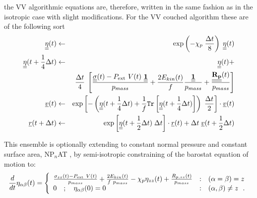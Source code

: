 the VV algorithmic equations are, therefore,
written in the same fashion as in the isotropic case with
slight modifications.  For the VV couched algorithm
these are of the following sort
\begin{eqnarray}
\mbox{$\underline{\underline{\bf \eta}}$} (t) &\leftarrow& \exp \left( -\chi_{p} \; {\Delta t \over 8} \right) \;
\mbox{$\underline{\underline{\bf \eta}}$} (t)\nonumber \\
\mbox{$\underline{\underline{\bf \eta}}$}(t + {1 \over 4} \Delta t) &\leftarrow& \mbox{$\underline{\underline{\bf \eta}}$}(t) + \nonumber \\
&& {\Delta t \over 4} \; \left[ \frac{\mbox{$\underline{\underline{\bf \sigma}}$}(t) - P_{\rm ext}~V(t)~\mbox{$\underline{\underline{\bf 1}}$}}{p_{mass}} +
\frac{2 E_{kin}(t)}{f} \frac{\mbox{$\underline{\underline{\bf 1}}$}}{p_{mass}} + \frac{\mbox{$\underline{\underline{\bf R_{p}}}$}(t)}{p_{mass}} \right] \\
\mbox{$\underline{v}$}(t) &\leftarrow& \exp \left[ -\left( \mbox{$\underline{\underline{\bf \eta}}$}(t + {1 \over 4}\Delta t) +
\frac{1}{f} {\tt Tr}\left[\mbox{$\underline{\underline{\bf \eta}}$}(t + {1 \over 4}\Delta t)\right] \right) \;
{\Delta t \over 2} \right] \cdot \mbox{$\underline{v}$}(t) \nonumber \\
\mbox{$\underline{r}$}(t + \Delta t) &\leftarrow& \exp \left[ \mbox{$\underline{\underline{\bf \eta}}$} (t + {1 \over 2} \Delta t) \; \Delta t \right] \cdot
\mbox{$\underline{r}$}(t) + \Delta t \; \mbox{$\underline{v}$}(t + {1 \over 2} \Delta t) \nonumber
\end{eqnarray}


This ensemble is optionally extending to constant normal pressure
and constant surface area, NP$_{n}$AT \cite{ikeguchi-04a}, by semi-isotropic
constraining of the barostat equation of motion to:
\begin{equation}
\frac{d}{dt} \eta_{\alpha\beta}(t) = \left\{ \begin{array} {l@{\quad:\quad}l}
\frac{\sigma_{zz}(t) - P_{\rm ext}~V(t)}{p_{mass}} + \frac{2 E_{kin}(t)}{f~p_{mass}} -
\chi_{p} \eta_{zz}(t) + \frac{R_{p,zz}(t)}{p_{mass}} & (\alpha = \beta) = z \\
0~~~;~~~\eta_{\alpha\beta}(0) = 0 & (\alpha,\beta) \ne z~~.
\end{array} \right.
\end{equation}

